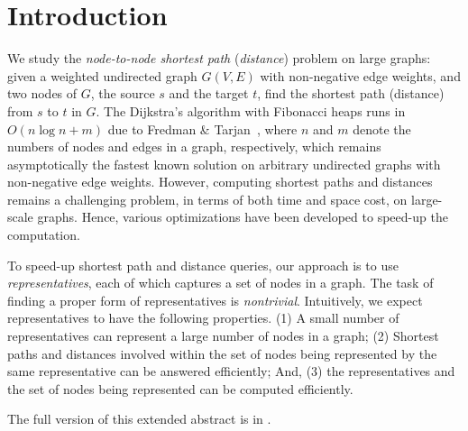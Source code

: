 \section{Introduction}
\label{sec-intro}


We study the {\em node-to-node shortest path} ({\em distance}) problem on large graphs: given a weighted undirected graph $G(V, E)$ with non-negative edge weights, and two nodes of $G$, the source $s$ and the target $t$, find the shortest path (distance) from $s$ to $t$ in $G$.
The Dijkstra's algorithm with Fibonacci heaps runs in $O(n\log n + m)$ due to Fredman \& Tarjan~\cite{CormenLRS01}, where $n$ and $m$ denote the numbers of nodes and edges in a graph, respectively, which remains asymptotically the fastest known solution on arbitrary undirected graphs with non-negative edge weights.
However, computing shortest  paths and distances remains a challenging problem, in terms of both time and space cost, on large-scale graphs. Hence, various optimizations have been developed to speed-up the computation.

To speed-up shortest  path and distance queries, our approach is to use {\em representatives}, each of which captures a set of nodes in a graph. The task of finding a proper form of representatives is {\em nontrivial}. Intuitively, we expect representatives to have the following properties.
%
(1) A small number of representatives can represent a large number of nodes in a graph;
%
(2) Shortest paths and distances involved within the set of nodes being represented by the same representative can be answered efficiently; And,
%
(3) the representatives and the set of nodes being represented can be computed efficiently.

The full version of this extended abstract is in \cite{journal-version2016}.

